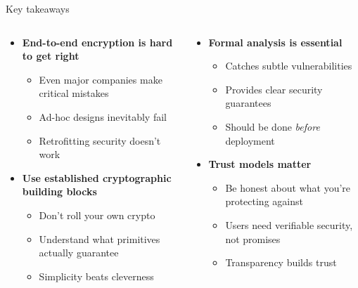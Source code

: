 \documentclass[aspectratio=169, lualatex, handout]{beamer}
\begin{document}
\begin{frame}{Key takeaways}
	\begin{columns}[c]
		\begin{column}{0.5\textwidth}
			\begin{itemize}
				\item \textbf{End-to-end encryption is hard to get right}
				      \begin{itemize}
					      \item Even major companies make critical mistakes
					      \item Ad-hoc designs inevitably fail
					      \item Retrofitting security doesn't work
				      \end{itemize}
				\item \textbf{Use established cryptographic building blocks}
				      \begin{itemize}
					      \item Don't roll your own crypto
					      \item Understand what primitives actually guarantee
					      \item Simplicity beats cleverness
				      \end{itemize}
			\end{itemize}
		\end{column}
		\begin{column}{0.5\textwidth}
			\begin{itemize}
				\item \textbf{Formal analysis is essential}
				      \begin{itemize}
					      \item Catches subtle vulnerabilities
					      \item Provides clear security guarantees
					      \item Should be done \textit{before} deployment
				      \end{itemize}
				\item \textbf{Trust models matter}
				      \begin{itemize}
					      \item Be honest about what you're protecting against
					      \item Users need verifiable security, not promises
					      \item Transparency builds trust
				      \end{itemize}
			\end{itemize}
		\end{column}
	\end{columns}
\end{frame}
\end{document}
